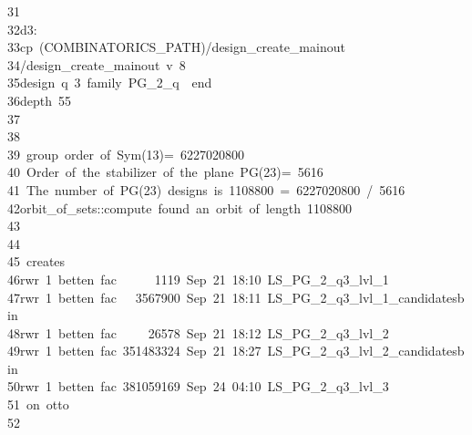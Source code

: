 \begin{tabbing}
31\>\\[0pt]
32\>d3:\\[0pt]
33\>\>cp\ (COMBINATORICS\_PATH)/design\_create\_mainout\ \\[0pt]
34\>\>/design\_create\_mainout\ v\ 8\ \ \\[0pt]
35\>\>\>design\ q\ 3\ family\ PG\_2\_q\ \ end\ \\[0pt]
36\>\>\>depth\ 55\\[0pt]
37\>\\[0pt]
38\>\\[0pt]
39\>\ group\ order\ of\ Sym(13)=\ 6227020800\\[0pt]
40\>\ Order\ of\ the\ stabilizer\ of\ the\ plane\ PG(23)=\ 5616\\[0pt]
41\>\ The\ number\ of\ PG(23)\ designs\ is\ 1108800\ =\ 6227020800\ /\ 5616\\[0pt]
42\>orbit\_of\_sets::compute\ found\ an\ orbit\ of\ length\ 1108800\\[0pt]
43\>\\[0pt]
44\>\\[0pt]
45\>\ creates\ \\[0pt]
46\>rwr\ 1\ betten\ fac\ \ \ \ \ \ 1119\ Sep\ 21\ 18:10\ LS\_PG\_2\_q3\_lvl\_1\\[0pt]
47\>rwr\ 1\ betten\ fac\ \ \ 3567900\ Sep\ 21\ 18:11\ LS\_PG\_2\_q3\_lvl\_1\_candidatesbin\\[0pt]
48\>rwr\ 1\ betten\ fac\ \ \ \ \ 26578\ Sep\ 21\ 18:12\ LS\_PG\_2\_q3\_lvl\_2\\[0pt]
49\>rwr\ 1\ betten\ fac\ 351483324\ Sep\ 21\ 18:27\ LS\_PG\_2\_q3\_lvl\_2\_candidatesbin\\[0pt]
50\>rwr\ 1\ betten\ fac\ 381059169\ Sep\ 24\ 04:10\ LS\_PG\_2\_q3\_lvl\_3\\[0pt]
51\>\ on\ otto\\[0pt]
52\>\\[0pt]

\end{tabbing}
